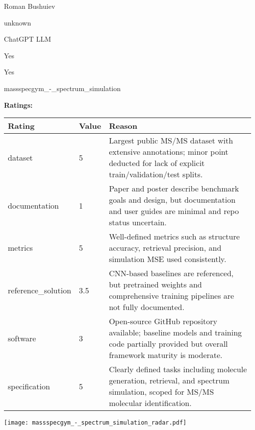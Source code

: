 {{\begin{description}[labelwidth=4cm, labelsep=1em, leftmargin=4cm, itemsep=0.1em, parsep=0em]
  \item[contact.name:] Roman Bushuiev
  \item[contact.email:] unknown
  \item[results.links.name:] ChatGPT LLM
  \item[fair.reproducible:] Yes
  \item[fair.benchmark\_ready:] Yes
  \item[id:] massspecgym\_-\_spectrum\_simulation
  \item[Citations:] \cite{neurips2024_c6c31413}
\end{description}

{\bf Ratings:} ~ \\

\begin{tabular}{p{} p{} p{}}
\hline
Rating & Value & Reason \\
\hline
dataset & 5 & Largest public MS/MS dataset with extensive annotations; minor point deducted for
lack of explicit train/validation/test splits.
 \\
documentation & 1 & Paper and poster describe benchmark goals and design, but documentation and user
guides are minimal and repo status uncertain.
 \\
metrics & 5 & Well-defined metrics such as structure accuracy, retrieval precision, and simulation MSE
used consistently.
 \\
reference\_solution & 3.5 & CNN-based baselines are referenced, but pretrained weights and comprehensive training
pipelines are not fully documented.
 \\
software & 3 & Open-source GitHub repository available; baseline models and training code partially
provided but overall framework maturity is moderate.
 \\
specification & 5 & Clearly defined tasks including molecule generation, retrieval, and spectrum simulation,
scoped for MS/MS molecular identification.
 \\
\hline
\end{tabular}

\texttt{[image: massspecgym\_-\_spectrum\_simulation\_radar.pdf]}
}}
\clearpage